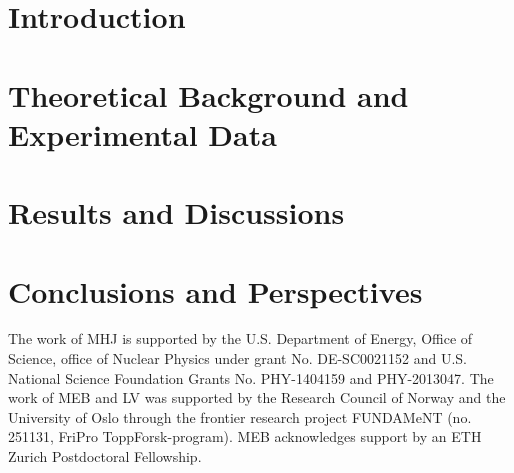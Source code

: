 \documentclass[superscriptaddress,unsortedaddress,
 amsmath,amssymb,
 aps,
]{revtex4-2}
\begin{document}




\maketitle

\section{Introduction}


\section{Theoretical Background and Experimental Data} 

\section{Results and Discussions}

\section{Conclusions and Perspectives}


\begin{acknowledgments}

The work of MHJ is supported by the U.S. Department of Energy,
Office of Science, office of Nuclear Physics under grant
No. DE-SC0021152 and U.S. National Science Foundation Grants
No. PHY-1404159 and PHY-2013047. 
The work of MEB and LV was supported by the Research Council of Norway and the University of Oslo through the frontier research project FUNDAMeNT (no. 251131, FriPro ToppForsk-program). 
MEB acknowledges support by an ETH Zurich Postdoctoral Fellowship. 

\end{acknowledgments}

\end{document}
